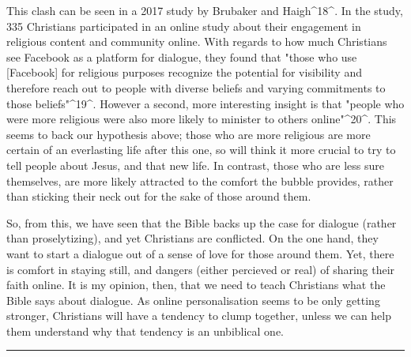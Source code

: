 \documentclass[]{article}
\begin{document}
This clash can be seen in a 2017 study by Brubaker and Haigh\^{}18\^{}.
In the study, 335 Christians participated in an online study about their
engagement in religious content and community online. With regards to
how much Christians see Facebook as a platform for dialogue, they found
that "those who use {[}Facebook{]} for religious purposes recognize the
potential for visibility and therefore reach out to people with diverse
beliefs and varying commitments to those beliefs"\^{}19\^{}. However a
second, more interesting insight is that "people who were more religious
were also more likely to minister to others online"\^{}20\^{}. This
seems to back our hypothesis above; those who are more religious are
more certain of an everlasting life after this one, so will think it
more crucial to try to tell people about Jesus, and that new life. In
contrast, those who are less sure themselves, are more likely attracted
to the comfort the bubble provides, rather than sticking their neck out
for the sake of those around them.

So, from this, we have seen that the Bible backs up the case for
dialogue (rather than proselytizing), and yet Christians are conflicted.
On the one hand, they want to start a dialogue out of a sense of love
for those around them. Yet, there is comfort in staying still, and
dangers (either percieved or real) of sharing their faith online. It is
my opinion, then, that we need to teach Christians what the Bible says
about dialogue. As online personalisation seems to be only getting
stronger, Christians will have a tendency to clump together, unless we
can help them understand why that tendency is an unbiblical one.

\begin{center}\rule{0.5\linewidth}{\linethickness}\end{center}
\end{document}
